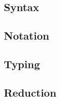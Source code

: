 \section{\LangA}

\subsection{Syntax}


\subsection{Notation}


\newpage
\subsection{Typing}


\newpage
\subsection{Reduction}

